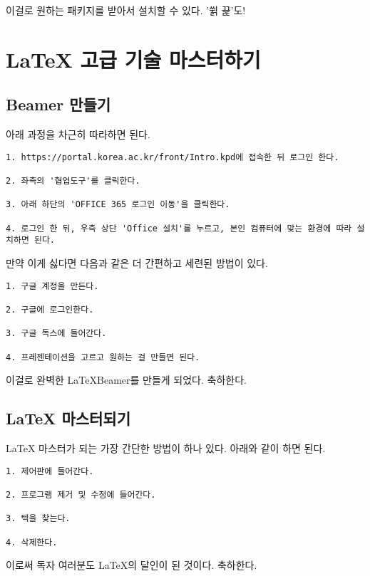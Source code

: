 \documentclass[11pt]{article} %
\begin{document}
이걸로 원하는 패키지를 받아서 설치할 수 있다. '쓁 끑'도!
\section{\LaTeX{} 고급 기술 마스터하기}
\subsection{Beamer 만들기}
아래 과정을 차근히 따라하면 된다.

\begin{verbatim}
1. https://portal.korea.ac.kr/front/Intro.kpd에 접속한 뒤 로그인 한다.

2. 좌측의 '협업도구'를 클릭한다.

3. 아래 하단의 'OFFICE 365 로그인 이동'을 클릭한다.

4. 로그인 한 뒤, 우측 상단 'Office 설치'를 누르고, 본인 컴퓨터에 맞는 환경에 따라 설치하면 된다.  

\end{verbatim}

만약 이게 싫다면 다음과 같은 더 간편하고 세련된 방법이 있다.

\begin{verbatim}
1. 구글 계정을 만든다.

2. 구글에 로그인한다.

3. 구글 독스에 들어간다.

4. 프레젠테이션을 고르고 원하는 걸 만들면 된다.   
\end{verbatim}

이걸로 완벽한 \LaTeX Beamer를 만들게 되었다. 축하한다.
\subsection{\LaTeX{} 마스터되기}
\LaTeX{} 마스터가 되는 가장 간단한 방법이 하나 있다. 아래와 같이 하면 된다.

\begin{verbatim}
1. 제어판에 들어간다.

2. 프로그램 제거 및 수정에 들어간다.

3. 텍을 찾는다.

4. 삭제한다.   
\end{verbatim}

이로써 독자 여러분도 \LaTeX{}의 달인이 된 것이다. 축하한다.
\end{document}
